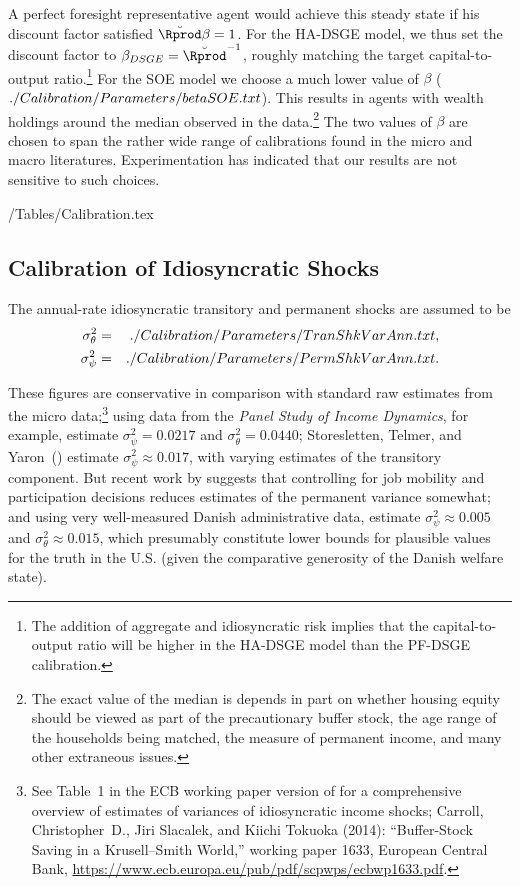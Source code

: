 \documentclass[titlepage]{\econtex}\newcommand{\texname}{cAndCwithStickyE}
\begin{document}
A perfect foresight representative agent would achieve this steady state if his discount factor satisfied $\breve{\Rprod} \beta = 1$.  For the HA-DSGE model, we thus set the discount factor to $\beta_{DSGE} = \breve{\Rprod}^{-1}$, roughly matching the target capital-to-output ratio.\footnote{The addition of aggregate and idiosyncratic risk implies that the capital-to-output ratio will be higher in the HA-DSGE model than the PF-DSGE calibration.} For the SOE model we choose a much lower value of $\beta$ ($  ./Calibration/Parameters/betaSOE.txt $). This results in agents with wealth holdings around the median observed in the data.\footnote{The exact value of the median is depends in part on whether housing equity should be viewed as part of the precautionary buffer stock, the age range of the households being matched, the measure of permanent income, and many other extraneous issues.}  The two values of $\beta$ are chosen to span the rather wide range of calibrations found in the micro and macro literatures.  Experimentation has indicated that our results are not sensitive to such choices.

\econtexRoot/Tables/Calibration.tex

\subsection{Calibration of Idiosyncratic Shocks}

The annual-rate idiosyncratic transitory and permanent shocks are assumed to be
\begin{eqnarray*}
   \sigma_{\theta}^{2} & = &  ./Calibration/Parameters/TranShkVarAnn.txt ,
\\ \sigma_{\psi}^{2}             & = &  ./Calibration/Parameters/PermShkVarAnn.txt
.
\end{eqnarray*}

These figures are conservative in comparison with standard raw estimates from the micro data;\footnote{See Table~1 in the ECB working paper version of \cite{cstKS} for a comprehensive overview of estimates of variances of idiosyncratic income shocks; Carroll, Christopher~D., Jiri Slacalek, and Kiichi Tokuoka (2014): ``Buffer-Stock Saving in a Krusell--Smith World,'' working paper 1633, European Central Bank, \url{https://www.ecb.europa.eu/pub/pdf/scpwps/ecbwp1633.pdf}.} using data from the {\it Panel Study of Income Dynamics}, for example, \cite{carroll&samwick:nature} estimate $\sigma_{\psi}^{2} = 0.0217$ and $\sigma_{\theta}^{2} = 0.0440$; Storesletten, Telmer, and Yaron~(\citeyear{sty:consumption}) estimate $\sigma_{\psi}^{2} \approx 0.017$, with varying estimates of the transitory component.  But recent work by \cite{lmp:wagerisk} suggests that controlling for job mobility and participation decisions reduces estimates of the permanent variance somewhat; and using very well-measured Danish administrative data, \cite{nv:risk} estimate $\sigma_{\psi}^{2} \approx 0.005$ and $\sigma_{\theta}^{2} \approx 0.015$, which presumably constitute lower bounds for plausible values for the truth in the U.S. (given the comparative generosity of the Danish welfare state).
\end{document}
